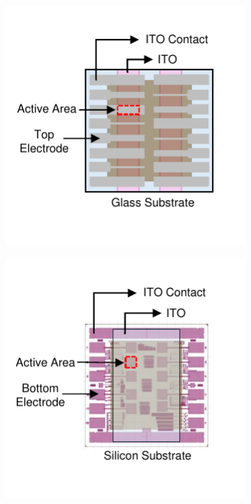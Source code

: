 \begin{figure}[htbp]
    \centering
    \begin{subfigure}[t]{0.49\textwidth} %
        \centering
        \includegraphics[width=\textwidth]{chapters/material_properties/images/Glass_Substrate.pdf} %
        \caption{}
        \label{fig:ch2:glass_substrate}
    \end{subfigure}
    \hfill %
    \begin{subfigure}[t]{0.49\textwidth} %
        \centering
        \includegraphics[width=\textwidth]{chapters/material_properties/images/PIX_Substrate.pdf} %
        \caption{}
        \label{fig:ch2:pix_substrate}
    \end{subfigure}


\end{figure}
